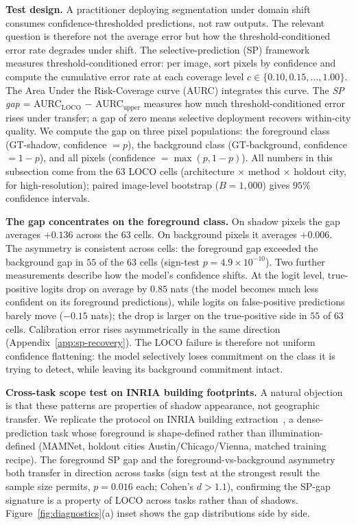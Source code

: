 \textbf{Test design.} A practitioner deploying segmentation under domain shift consumes confidence-thresholded predictions, not raw outputs. The relevant question is therefore not the average error but how the threshold-conditioned error rate degrades under shift. The selective-prediction (SP) framework~\cite{geifman2017selective, traub2024overcoming, cattelan2023fix} measures threshold-conditioned error: per image, sort pixels by confidence and compute the cumulative error rate at each coverage level $c \in \{0.10, 0.15, \ldots, 1.00\}$. The Area Under the Risk-Coverage curve (AURC) integrates this curve. The \emph{SP gap} = AURC$_{\text{LOCO}}$ $-$ AURC$_{\text{upper}}$ measures how much threshold-conditioned error rises under transfer; a gap of zero means selective deployment recovers within-city quality. We compute the gap on three pixel populations: the foreground class (GT-shadow, confidence $= p$), the background class (GT-background, confidence $= 1{-}p$), and all pixels (confidence $= \max(p, 1{-}p)$). All numbers in this subsection come from the $63$ LOCO cells (architecture $\times$ method $\times$ holdout city, for high-resolution); paired image-level bootstrap ($B = 1{,}000$) gives $95\%$ confidence intervals.

\textbf{The gap concentrates on the foreground class.} On shadow pixels the gap averages $+0.136$ across the $63$ cells. On background pixels it averages $+0.006$. The asymmetry is consistent across cells: the foreground gap exceeded the background gap in $55$ of the $63$ cells (sign-test $p = 4.9 \times 10^{-10}$). Two further measurements describe how the model's confidence shifts. At the logit level, true-positive logits drop on average by $0.85$ nats (the model becomes much less confident on its foreground predictions), while logits on false-positive predictions barely move ($-0.15$ nats); the drop is larger on the true-positive side in $55$ of $63$ cells. Calibration error rises asymmetrically in the same direction (Appendix~\ref{app:sp-recovery}). The LOCO failure is therefore not uniform confidence flattening: the model selectively loses commitment on the class it is trying to detect, while leaving its background commitment intact.

\textbf{Cross-task scope test on INRIA building footprints.} A natural objection is that these patterns are properties of shadow appearance, not geographic transfer. We replicate the protocol on INRIA building extraction~\cite{inria}, a dense-prediction task whose foreground is shape-defined rather than illumination-defined (MAMNet, holdout cities Austin/Chicago/Vienna, matched training recipe). The foreground SP gap and the foreground-vs-background asymmetry both transfer in direction across tasks (sign test at the strongest result the sample size permits, $p=0.016$ each; Cohen's $d>1.1$), confirming the SP-gap signature is a property of LOCO across tasks rather than of shadows. Figure~\ref{fig:diagnostics}(a) inset shows the gap distributions side by side.


